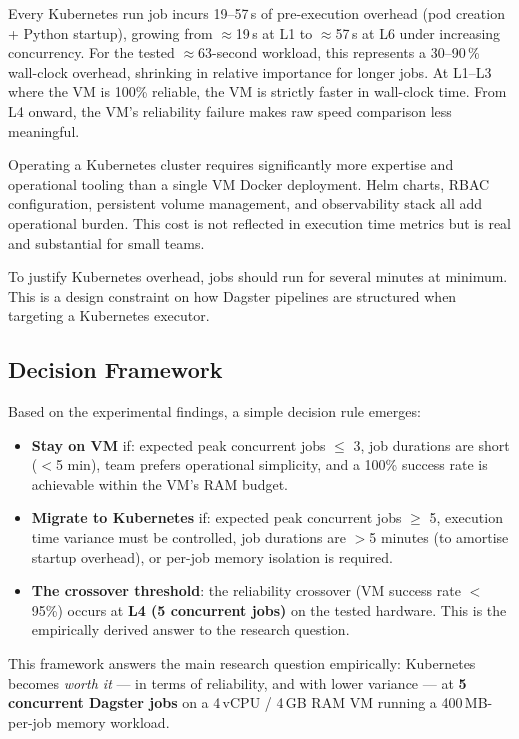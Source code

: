\begin{description}[style=nextline]
  \item[Container startup overhead.]
  Every Kubernetes run job incurs 19--57\,s of pre-execution overhead (pod creation + Python startup), growing from $\approx$19\,s at L1 to $\approx$57\,s at L6 under increasing concurrency.
  For the tested $\approx$63-second workload, this represents a 30--90\,\% wall-clock overhead, shrinking in relative importance for longer jobs.
  At L1--L3 where the VM is 100\% reliable, the VM is strictly faster in wall-clock time.
  From L4 onward, the VM's reliability failure makes raw speed comparison less meaningful.

  \item[Infrastructure complexity.]
  Operating a Kubernetes cluster requires significantly more expertise and operational tooling than a single VM Docker deployment.
  Helm charts, RBAC configuration, persistent volume management, and observability stack all add operational burden.
  This cost is not reflected in execution time metrics but is real and substantial for small teams.

  \item[Minimum job duration for viability.]
  To justify Kubernetes overhead, jobs should run for several minutes at minimum.
  This is a design constraint on how Dagster pipelines are structured when targeting a Kubernetes executor.
\end{description}

\subsection{Decision Framework}
\label{subsec:decision-framework}

Based on the experimental findings, a simple decision rule emerges:

\begin{itemize}
  \item \textbf{Stay on VM} if: expected peak concurrent jobs $\leq$ 3, job durations are short ($<$5 min), team prefers operational simplicity, and a 100\% success rate is achievable within the VM's RAM budget.
  \item \textbf{Migrate to Kubernetes} if: expected peak concurrent jobs $\geq$ 5, execution time variance must be controlled, job durations are $>$5 minutes (to amortise startup overhead), or per-job memory isolation is required.
  \item \textbf{The crossover threshold}: the reliability crossover (VM success rate $<$95\%) occurs at \textbf{L4 (5 concurrent jobs)} on the tested hardware. This is the empirically derived answer to the research question.
\end{itemize}

This framework answers the main research question empirically: Kubernetes becomes \emph{worth it} --- in terms of reliability, and with lower variance --- at \textbf{5 concurrent Dagster jobs} on a 4\,vCPU / 4\,GB RAM VM running a 400\,MB-per-job memory workload.

